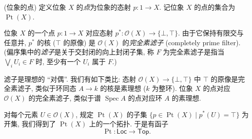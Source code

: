 
\begin{definition}
	[label={points-of-locale}]
	{(位象的点)}
	定义位象 $X$ 的\emph{点}为位象的态射 $p\colon 1 \to X$.
	记位象 $X$ 的点的集合为 $\operatorname{Pt}(X)$.
\end{definition}

位象 $X$ 的一个点 $p\colon 1 \to X$ 对应\fm{}态射 $p^*\colon \mathcal O(X) \to \{\bot,\top\}$.
由于它保持有限交与任意并, $p^*$ 的核 ($\top$ 的原像) 是 $\mathcal O(X)$ 的\emph{完全素滤子} (completely prime filter). (偏序集中的\emph{滤子}是关于交封闭的向上封闭子集, 称 $F$ 为完全素滤子是指当 $\bigvee_i U_i \in F$ 时, 至少有一个 $U_i$ 属于 $F$.)

\begin{remark}
	[label={completely-prime-filter-vs-prime-ideal}]
	{}
	滤子是理想的 ``对偶''. 我们有如下类比: 态射 $\mathcal O(X)\to \{\bot,\top\}$ 中 $\top$ 的原像是完全素滤子, 类似于环同态 $A\to k$ 的核是素理想 ($k$ 为整环). 位象 $X$ 的点对应 $\mathcal O(X)$ 的完全素滤子, 类似于谱 $\operatorname{Spec}A$ 的点对应环 $A$ 的素理想.
\end{remark}

对每个元素 $U\in\mathcal O(X)$, 规定 $\operatorname{Pt}(X)$ 的子集
$\{p \in \operatorname{Pt}(X) \mid p^*(U) = \top\}$ 为开集,
我们得到了 $\operatorname{Pt}(X)$ 上的一个拓扑. 于是有函子
$$\operatorname{Pt} \colon \mathsf {Loc} \to \mathsf {Top}.$$

